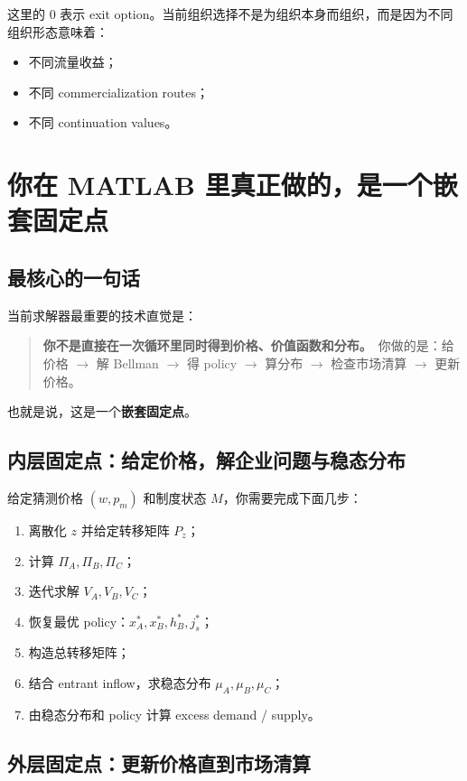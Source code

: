 \documentclass[12pt]{ctexart}
\begin{document}
这里的 $0$ 表示 exit option。当前组织选择不是为组织本身而组织，而是因为不同组织形态意味着：
\begin{itemize}
    \item 不同流量收益；
    \item 不同 commercialization routes；
    \item 不同 continuation values。
\end{itemize}

\section{你在 MATLAB 里真正做的，是一个嵌套固定点}

\subsection{最核心的一句话}

当前求解器最重要的技术直觉是：
\begin{quote}
\textbf{你不是直接在一次循环里同时得到价格、价值函数和分布。}\
你做的是：给价格 $\to$ 解 Bellman $\to$ 得 policy $\to$ 算分布 $\to$ 检查市场清算 $\to$ 更新价格。
\end{quote}

也就是说，这是一个\textbf{嵌套固定点}。

\subsection{内层固定点：给定价格，解企业问题与稳态分布}

给定猜测价格 $(w,p_m)$ 和制度状态 $M$，你需要完成下面几步：
\begin{enumerate}
    \item 离散化 $z$ 并给定转移矩阵 $P_z$；
    \item 计算 $\Pi_A,\Pi_B,\Pi_C$；
    \item 迭代求解 $V_A,V_B,V_C$；
    \item 恢复最优 policy：$x_A^*,x_B^*,h_B^*,j_s^*$；
    \item 构造总转移矩阵；
    \item 结合 entrant inflow，求稳态分布 $\mu_A,\mu_B,\mu_C$；
    \item 由稳态分布和 policy 计算 excess demand / supply。
\end{enumerate}

\subsection{外层固定点：更新价格直到市场清算}
\end{document}

